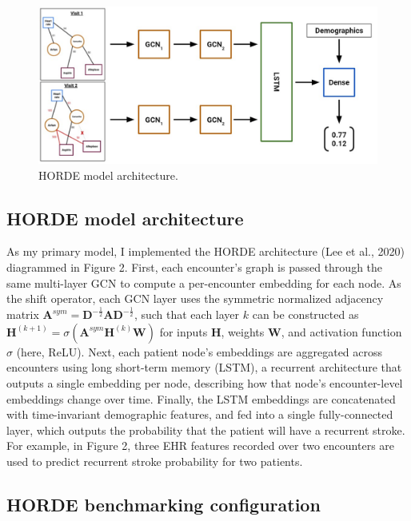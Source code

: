 \documentclass{article}
\begin{document}
\begin{figure}
    \centering
    \includegraphics[scale=0.35]{horde_architecture.jpg}
    \caption{HORDE model architecture.}
    \label{fig:horde_arch}
\end{figure}

\subsection{HORDE model architecture}

As my primary model, I implemented the HORDE architecture (Lee et al., 2020) diagrammed in Figure 2. First, each encounter's graph is passed through the same multi-layer GCN to compute a per-encounter embedding for each node. As the shift operator, each GCN layer uses the symmetric normalized adjacency matrix $\textbf{A}^{sym} = \textbf{D}^{-\frac{1}{2}}\textbf{AD}^{-\frac{1}{2}}$,  such that each layer $k$ can be constructed as $\textbf{H}^{(k+1)} = \sigma(\textbf{A}^{sym}\textbf{H}^{(k)}\textbf{W})$ for inputs $\textbf{H}$, weights $\textbf{W}$, and activation function $\sigma$ (here, ReLU). Next, each patient node's embeddings are aggregated across encounters using long short-term memory (LSTM), a recurrent architecture that outputs a single embedding per node, describing how that node's encounter-level embeddings change over time. Finally, the LSTM embeddings are concatenated with time-invariant demographic features, and fed into a single fully-connected layer, which outputs the probability that the patient will have a recurrent stroke. For example, in Figure 2, three EHR features recorded over two encounters are used to predict recurrent stroke probability for two patients.

\subsection{HORDE benchmarking configuration}
\end{document}
